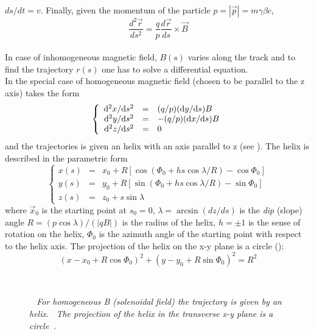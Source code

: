 $ds/dt=v$. Finally, given the momentum of the particle
$p= |\vec{p}|= m\gamma\beta c$,
\begin{equation}\label{Lorentz_trajectory}
  \frac{d^{2}\vec{r}}{ds^{2}}=\frac{q}{p}\frac{d\vec{r}}{ds}\times\vec{B}
\end{equation}
\\
In case of inhomogeneous magnetic field, $B(s)$ varies along the track and to
find the trajectory $r(s)$ one has to solve a differential
equation.\\
In the special case of homogeneous magnetic field (chosen to be parallel to the
z axis)  takes the form
\begin{equation}
  \left\{
    \begin{array}{rcl}
      {\rm d}^{2}x/{\rm d}s^{2}&=&(q/p)({\rm d}y/{\rm d}s)B \\
      {\rm d}^{2}y/{\rm d}s^{2}&=&-(q/p)({\rm d}x/{\rm d}s)B \\
      {\rm d}^{2}z/{\rm d}s^{2}&=&0
    \end{array}
  \right.
\end{equation}
and the trajectories is given an helix with an axis parallel to z (see
). The helix is described in the parametric form
\begin{equation}
  \left\{
    \begin{array}{rcl}
      x(s)&=&x_0+R[\cos(\Phi_0+hs\cos\lambda/R)-\cos\Phi_0] \\
      y(s)&=&y_0+R[\sin(\Phi_0+hs\cos\lambda/R)-\sin\Phi_0] \\
      z(s)&=&z_0+s\sin\lambda 
    \end{array}
  \right.
\end{equation}
where $\vec{x}_{0}$ is the starting point at $s_{0}=0$, $\lambda=\arcsin(dz/ds)$
is the {\it dip} (slope) angle $R=(p\cos\lambda)/(|qB|)$ is the radius of the
helix, $h=\pm 1$ is the sense of rotation on the helix, $\Phi_{0}$ is the
azimuth angle of the starting point with respect to the helix axis. The
projection of the helix on the x-y plane is a circle ():
\begin{equation}
  (x-x_0+R\cos\Phi_0)^2+(y-y_0+R\sin\Phi_0)^2=R^2
\end{equation}
\begin{figure}
  \centering {}
   \\
  \caption{\textit{~ For homogeneous B (solenoidal field) the
      trajectory is given by an helix.~ The projection of the
      helix in the transverse x-y plane is a
      circle~\cite{Ragusa}.}}\label{helix}
\end{figure}

